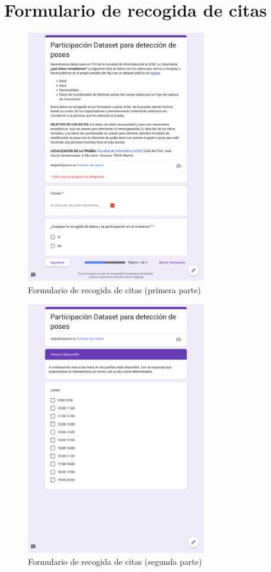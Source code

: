 \chapter{Formulario de recogida de citas}
\label{appendix:formularioCitas}

\begin{figure}[H]
    \centering
    \includegraphics[width=0.7\textwidth]{Imagenes/Vectorial/Form_Participacion1.pdf}
    \caption{Formulario de recogida de citas (primera parte)}
    \label{fig:formulario-citas}
\end{figure}

\begin{figure}[H]
    \centering
    \includegraphics[width=0.7\textwidth]{Imagenes/Vectorial/Form_Participacion2.pdf}
    \caption{Formulario de recogida de citas (segunda parte)}
    \label{fig:formulario-citas-2}
\end{figure}